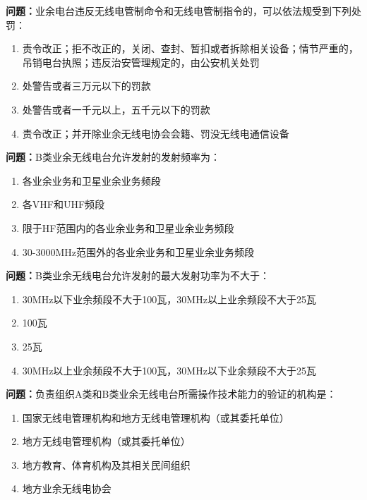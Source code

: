 \bigskip


\noindent\textbf{问题：}业余电台违反无线电管制命令和无线电管制指令的，可以依法规受到下列处罚：
\begin{enumerate}[label=\Alph*), leftmargin=3em]
\item  责令改正；拒不改正的，关闭、查封、暂扣或者拆除相关设备；情节严重的，吊销电台执照；违反治安管理规定的，由公安机关处罚
\item  处警告或者三万元以下的罚款
\item  处警告或者一千元以上，五千元以下的罚款 
\item  责令改正；并开除业余无线电协会会籍、罚没无线电通信设备
\end{enumerate}

\bigskip


\noindent\textbf{问题：}B类业余无线电台允许发射的发射频率为：
\begin{enumerate}[label=\Alph*), leftmargin=3em]
\item 各业余业务和卫星业余业务频段
\item 各VHF和UHF频段
\item 限于HF范围内的各业余业务和卫星业余业务频段
\item 30-3000MHz范围外的各业余业务和卫星业余业务频段
\end{enumerate}

\bigskip


\noindent\textbf{问题：}B类业余无线电台允许发射的最大发射功率为不大于：
\begin{enumerate}[label=\Alph*), leftmargin=3em]
\item 30MHz以下业余频段不大于100瓦，30MHz以上业余频段不大于25瓦
\item 100瓦
\item 25瓦
\item 30MHz以上业余频段不大于100瓦，30MHz以下业余频段不大于25瓦
\end{enumerate}

\bigskip


\noindent\textbf{问题：}负责组织A类和B类业余无线电台所需操作技术能力的验证的机构是：
\begin{enumerate}[label=\Alph*), leftmargin=3em]
\item 国家无线电管理机构和地方无线电管理机构（或其委托单位）
\item 地方无线电管理机构（或其委托单位）
\item 地方教育、体育机构及其相关民间组织
\item 地方业余无线电协会
\end{enumerate}

\bigskip
